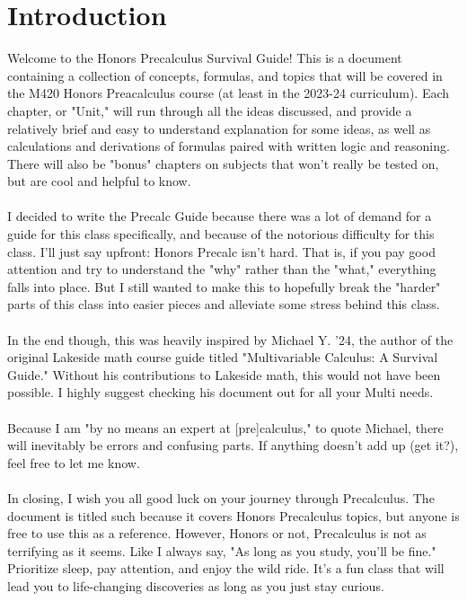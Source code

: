 \chapter{Introduction}

Welcome to the Honors Precalculus Survival Guide! This is a document containing a collection of concepts, formulas, and topics that will be covered in the M420 Honors Preacalculus course (at least in the 2023-24 curriculum). Each chapter, or "Unit," will run through all the ideas discussed, and provide a relatively brief and easy to understand explanation for some ideas, as well as calculations and derivations of formulas paired with written logic and reasoning. There will also be "bonus" chapters on subjects that won't really be tested on, but are cool and helpful to know.
\\\\
I decided to write the Precalc Guide because there was a lot of demand for a guide for this class specifically, and because of the notorious difficulty for this class. I'll just say upfront: Honors Precalc isn't hard. That is, if you pay good attention and try to understand the "why" rather than the "what," everything falls into place. But I still wanted to make this to hopefully break the "harder" parts of this class into easier pieces and alleviate some stress behind this class.
\\\\
In the end though, this was heavily inspired by Michael Y. '24, the author of the original Lakeside math course guide titled "Multivariable Calculus: A Survival Guide." Without his contributions to Lakeside math, this would not have been possible. I highly suggest checking his document out for all your Multi needs.
\\\\
Because I am "by no means an expert at [pre]calculus," to quote Michael, there will inevitably be errors and confusing parts. If anything doesn't add up (get it?), feel free to let me know. 
\\\\
In closing, I wish you all good luck on your journey through Precalculus. The document is titled such because it covers Honors Precalculus topics, but anyone is free to use this as a reference. However, Honors or not, Precalculus is not as terrifying as it seems. Like I always say, "As long as you study, you'll be fine." Prioritize sleep, pay attention, and enjoy the wild ride. It's a fun class that will lead you to life-changing discoveries as long as you just stay curious. 
